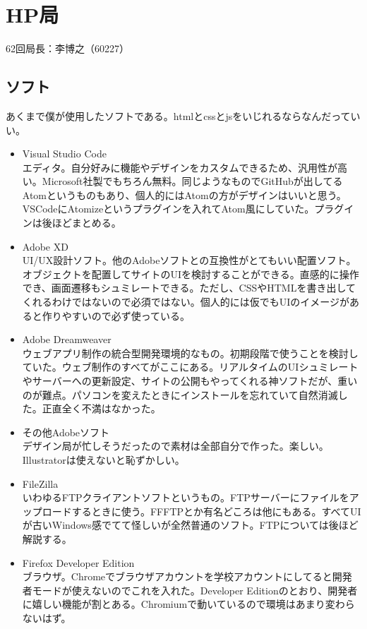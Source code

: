 \documentclass[dvipdfmx,jb5]{jarticle}
\begin{document}
  \section{HP局}
 62回局長：李博之（60227）
 \subsection{ソフト}
 あくまで僕が使用したソフトである。htmlとcssとjsをいじれるならなんだっていい。
  \begin{itemize}
  \item Visual Studio Code\\
  エディタ。自分好みに機能やデザインをカスタムできるため、汎用性が高い。Microsoft社製でもちろん無料。同じようなものでGitHubが出してるAtomというものもあり、個人的にはAtomの方がデザインはいいと思う。VSCodeにAtomizeというプラグインを入れてAtom風にしていた。プラグインは後ほどまとめる。
  \item Adobe XD\\
  UI/UX設計ソフト。他のAdobeソフトとの互換性がとてもいい配置ソフト。オブジェクトを配置してサイトのUIを検討することができる。直感的に操作でき、画面遷移もシュミレートできる。ただし、CSSやHTMLを書き出してくれるわけではないので必須ではない。個人的には仮でもUIのイメージがあると作りやすいので必ず使っている。
  \item Adobe Dreamweaver\\
  ウェブアプリ制作の統合型開発環境的なもの。初期段階で使うことを検討していた。ウェブ制作のすべてがここにある。リアルタイムのUIシュミレートやサーバーへの更新設定、サイトの公開もやってくれる神ソフトだが、重いのが難点。パソコンを変えたときにインストールを忘れていて自然消滅した。正直全く不満はなかった。
  \item その他Adobeソフト\\
  デザイン局が忙しそうだったので素材は全部自分で作った。楽しい。Illustratorは使えないと恥ずかしい。
  \item FileZilla\\
  いわゆるFTPクライアントソフトというもの。FTPサーバーにファイルをアップロードするときに使う。FFFTPとか有名どころは他にもある。すべてUIが古いWindows感でてて怪しいが全然普通のソフト。FTPについては後ほど解説する。
  \item Firefox Developer Edition\\
  ブラウザ。Chromeでブラウザアカウントを学校アカウントにしてると開発者モードが使えないのでこれを入れた。Developer Editionのとおり、開発者に嬉しい機能が割とある。Chromiumで動いているので環境はあまり変わらないはず。
 \end{itemize}
\end{document}
